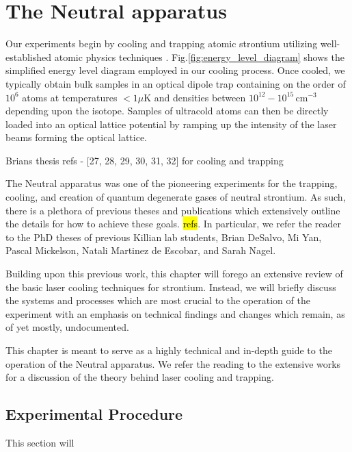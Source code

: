 \chapter{The Neutral apparatus}
\label{ch:chap2}

Our experiments begin by cooling and trapping atomic strontium utilizing well-established atomic physics techniques \cite{Metcalf1999,Katori1999,Ido2000,Nagel2003,Mukaiyama2003a,Loftus2004,DeEscobar2009a,Stellmer2009,Stellmer2010,Mickelson2010,DeSalvo2010,Tey2010a}. Fig.\;\ref{fig:energy_level_diagram} shows the simplified energy level diagram employed in our cooling process. Once cooled, we typically obtain bulk samples in an optical dipole trap containing on the order of $10^6$ atoms at temperatures $<1\mu$K and densities between $10^{12} - 10^{15}\,$cm$^{-3}$ depending upon the isotope. Samples of ultracold atoms can then be directly loaded into an optical lattice potential by ramping up the intensity of the laser beams forming the optical lattice.


Brians thesis
refs - [27, 28, 29, 30, 31, 32] for cooling and trapping

The Neutral apparatus was one of the pioneering experiments for the trapping, cooling, and creation of quantum degenerate gases of neutral strontium. As such, there is a plethora of previous theses and publications which extensively outline the details for how to achieve these goals. \hl{refs}. In particular, we refer the reader to the PhD theses of previous Killian lab students, Brian DeSalvo, Mi Yan, Pascal Mickelson, Natali Martinez de Escobar, and Sarah Nagel.

Building upon this previous work, this chapter will forego an extensive review of the basic laser cooling techniques for strontium. Instead, we will briefly discuss the systems and processes which are most crucial to the operation of the experiment with an emphasis on technical findings and changes which remain, as of yet mostly, undocumented.

This chapter is meant to serve as a highly technical and in-depth guide to the operation of the Neutral apparatus. We refer the reading to the extensive works for a discussion of the theory behind laser cooling and trapping.

\section{Experimental Procedure} \label{sec:trapping}
This section will 

